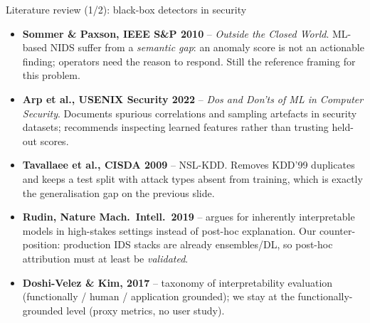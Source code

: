 \documentclass[10pt,aspectratio=169]{beamer}
\begin{document}
\begin{frame}{Literature review (1/2): black-box detectors in security}
\small
\begin{itemize}\itemsep4pt
  \item \textbf{Sommer \& Paxson, IEEE S\&P 2010} -- \emph{Outside the Closed
        World}. ML-based NIDS suffer from a \emph{semantic gap}: an anomaly
        score is not an actionable finding; operators need the reason to
        respond. Still the reference framing for this problem.
  \item \textbf{Arp et al., USENIX Security 2022} -- \emph{Dos and Don'ts of ML
        in Computer Security}. Documents spurious correlations and sampling
        artefacts in security datasets; recommends inspecting learned features
        rather than trusting held-out scores.
  \item \textbf{Tavallaee et al., CISDA 2009} -- NSL-KDD. Removes KDD'99
        duplicates and keeps a test split with attack types absent from
        training, which is exactly the generalisation gap on the previous slide.
  \item \textbf{Rudin, Nature Mach.\ Intell.\ 2019} -- argues for inherently
        interpretable models in high-stakes settings instead of post-hoc
        explanation. Our counter-position: production IDS stacks are already
        ensembles/DL, so post-hoc attribution must at least be \emph{validated}.
  \item \textbf{Doshi-Velez \& Kim, 2017} -- taxonomy of interpretability
        evaluation (functionally / human / application grounded); we stay at the
        functionally-grounded level (proxy metrics, no user study).
\end{itemize}
\end{frame}
\end{document}
